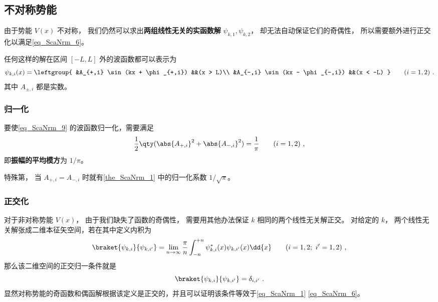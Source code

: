 \subsection{不对称势能}
由于势能 $V(x)$ 不对称， 我们仍然可以求出\textbf{两组线性无关的实函数解} $\psi_{k,1},\psi_{k,2}$， 却无法自动保证它们的奇偶性， 所以需要额外进行正交化以满足\autoref{eq_ScaNrm_6}。

任何这样的解在区间 $[-L,L]$ 外的波函数都可以表示为
\begin{equation}\label{eq_ScaNrm_9}
\psi_{k,i}(x) = \leftgroup{
    &A_{+,i} \sin(kx + \phi_{+,i}) &&(x > L)\\
    &A_{-,i} \sin(kx - \phi_{-,i}) &&(x < -L)
} \qquad (i = 1,2)~.
\end{equation}
其中 $A_{\pm,i}$ 都是实数。

\subsubsection{归一化}
\begin{theorem}{}\label{the_ScaNrm_2}
要使\autoref{eq_ScaNrm_9} 的波函数归一化，需要满足
\begin{equation}\label{eq_ScaNrm_4}
\frac{1}{2}\qty(\abs{A_{+,i}}^2 + \abs{A_{-,i}}^2) = \frac{1}{\pi} \qquad (i = 1,2)~,
\end{equation}
即\textbf{振幅的平均模方}为 $1/\pi$。
\end{theorem}
特殊第， 当 $A_{+,i} = A_{-,i}$ 时就有\autoref{the_ScaNrm_1} 中的归一化系数 $1/\sqrt{\pi}$。

\subsubsection{正交化}
对于非对称势能 $V(x)$， 由于我们缺失了函数的奇偶性， 需要用其他办法保证 $k$ 相同的两个线性无关解正交。 对给定的 $k$， 两个线性无关解张成二维本征矢空间，若在其中定义内积为
\begin{equation}\label{eq_ScaNrm_13}
\braket{\psi_{k,i}}{\psi_{k,i'}} = \lim_{n\to\infty}\frac{\pi}{n}\int_{-n}^{+n} \psi_{k,i}^*(x) \psi_{k,i'}(x) \dd{x} \qquad (i = 1,2;\ i' = 1,2)~,
\end{equation}
那么该二维空间的正交归一条件就是
\begin{equation}\label{eq_ScaNrm_7}
\braket{\psi_{k,i}}{\psi_{k,i'}} = \delta_{i,i'}~.
\end{equation}
显然对称势能的奇函数和偶函解根据该定义是正交的，并且可以证明该条件等效于\autoref{eq_ScaNrm_1} \autoref{eq_ScaNrm_6}。


